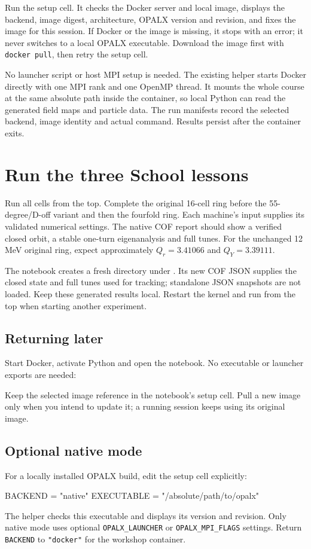 \documentclass[11pt,a4paper]{article}
\begin{document}
Run the setup cell. It checks the Docker server and local image, displays the
backend, image digest, architecture, OPALX version and revision, and fixes the
image for this session. If Docker or the image is missing, it stops with an
error; it never switches to a local OPALX executable. Download the image first
with \texttt{docker pull}, then retry the setup cell.

No launcher script or host MPI setup is needed. The existing helper starts
Docker directly with one MPI rank and one OpenMP thread. It mounts the whole
course at the same absolute path inside the container, so local Python can
read the generated field maps and particle data. The run manifests record the
selected backend, image identity and actual command. Results persist after
the container exits.

\clearpage
\section{Run the three School lessons}
Run all cells from the top. Complete the original 16-cell ring before the
55-degree/D-off variant and then the fourfold ring. Each machine's input
supplies its validated numerical settings. The native COF report should show
a verified closed orbit, a stable one-turn eigenanalysis and full tunes.
For the unchanged 12 MeV original ring, expect approximately
$Q_r=3.41066$ and $Q_Y=3.39111$.

The notebook creates a fresh directory under . Its new COF
JSON supplies the closed state and full tunes used for tracking; standalone
JSON snapshots are not loaded. Keep these generated results local. Restart
the kernel and run from the top when starting another experiment.

\subsection*{Returning later}
Start Docker, activate Python and open the notebook. No executable or launcher
exports are needed:
Keep the selected image reference in the notebook's setup cell. Pull a new
image only when you intend to update it; a running session keeps using its
original image.

\subsection*{Optional native mode}
For a locally installed OPALX build, edit the setup cell explicitly:
\begin{commands}
BACKEND = "native"
EXECUTABLE = "/absolute/path/to/opalx"
\end{commands}
The helper checks this executable and displays its version and revision.
Only native mode uses optional \texttt{OPALX\_LAUNCHER} or
\texttt{OPALX\_MPI\_FLAGS} settings. Return \texttt{BACKEND} to
\texttt{"docker"} for the workshop container.
\end{document}
